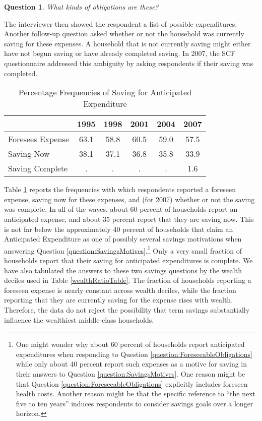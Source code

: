 \documentclass[fleqccn,12pt]{article}
\newtheorem{question}[theorem]{Question}
\begin{document}
\begin{question}
\label{question:KindsOfObligations}
 What kinds of obligations are these? 
\end{question} 
The interviewer then showed the respondent a list of possible expenditures. Another follow-up question asked whether or not the household was currently saving for these expenses. A household that is not currently saving might either have not begun saving or have already completed saving. In 2007, the SCF questionnaire addressed this ambiguity by asking respondents if their saving was completed. 

\begin{table}[t]
\begin{center}
%
\begin{tabular}{l*{ 5}{c}}
  & 1995 & 1998 & 2001 & 2004 & 2007\\ \hline
Foresees Expense&63.1&58.8&60.5&59.0&57.5\\
Saving Now&38.1&37.1&36.8&35.8&33.9\\
Saving Complete&  .&  .&  .&  .&1.6\\
\end{tabular}
\bigskip
\caption{Percentage Frequencies of Saving for Anticipated Expenditure\label{termSavingRates}}
\end{center}

\end{table}

Table \ref{termSavingRates} reports the frequencies with which respondents reported a foreseen expense, saving now for these expenses, and (for 2007) whether or not the saving was complete. In all of the waves, about 60 percent of households report an anticipated expense, and about 35 percent report that they are saving now. This is not far below the approximately 40 percent of households that claim an Anticipated Expenditure as one of possibly several savings motivations when answering Question \ref{question:SavingsMotives}.\footnote{One might wonder why about 60 percent of households report anticipated expenditures when responding to Question \ref{question:ForeseeableObligations} while only about 40 percent report such expenses as a motive for saving in their answers to Question \ref{question:SavingsMotives}. One reason might be that Question \ref{question:ForeseeableObligations} explicitly includes foreseen health costs. Another reason might be that the specific reference to ``the next five to ten years'' induces respondents to consider savings goals over a longer horizon.}  Only a very small fraction of households report that their saving for anticipated expenditures is complete. We have also tabulated the answers to these two savings questions by the wealth deciles used in Table \ref{wealthRatioTable}. The fraction of households reporting a foreseen expense is nearly constant across wealth deciles, while the fraction reporting that they are currently saving for the expense rises with wealth. Therefore, the data do not reject the possibility that term savings substantially influence the wealthiest middle-class households.
\end{document}
